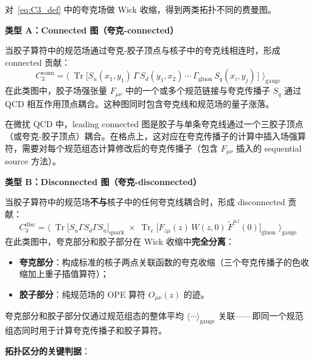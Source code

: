 \documentclass[11pt,a4paper]{ctexart}
\newcommand{\tr}{\operatorname{Tr}}
\begin{document}
对~\eqref{eq:C3_def} 中的夸克场做 Wick 收缩，得到两类拓扑不同的费曼图。

\textbf{类型 A：Connected 图（夸克-connected）}

当胶子算符中的规范场通过夸克-胶子顶点与核子中的夸克线相连时，形成 connected 贡献：
\begin{equation}\label{eq:connected}
C_3^{\text{conn}} = \big\langle\;
\tr\big[ S_u(x_1, y_1) \, \Gamma \, S_d(y_1, x_2) \, \cdots \,
\Gamma_{\text{gluon}} \, S_q(x_i, y_j) \,\big]
\;\big\rangle_{\text{gauge}}
\end{equation}
在此类图中，胶子场强张量 $F_{\mu\nu}$ 中的一个或多个规范链接与夸克传播子 $S_q$ 通过 QCD 相互作用顶点耦合。这种图同时包含夸克线和规范场的量子涨落。

在微扰 QCD 中，leading connected 图是胶子与单条夸克线通过一个三胶子顶点（或夸克-胶子顶点）耦合。在格点上，这对应在夸克传播子的计算中插入场强算符，需要对每个规范组态计算修改后的夸克传播子（包含 $F_{\mu\nu}$ 插入的 sequential source 方法）。

\textbf{类型 B：Disconnected 图（夸克-disconnected）}

当胶子算符中的规范场\textbf{不与}核子中的任何夸克线耦合时，形成 disconnected 贡献：
\begin{equation}\label{eq:disconnected}
C_3^{\text{disc}} = \big\langle\;
\tr\big[ S_u \Gamma S_d \Gamma S_u \big]_{\text{quark}}
\;\times\;
\tr_c\big[ F_{z\mu}(z) \, W(z,0) \, \tilde{F}^{\mu z}(0) \big]_{\text{gluon}}
\;\big\rangle_{\text{gauge}}
\end{equation}
在此类图中，夸克部分和胶子部分在 Wick 收缩中\textbf{完全分离}：
\begin{itemize}
  \item \textbf{夸克部分}：构成标准的核子两点关联函数的夸克收缩（三个夸克传播子的色收缩加上重子插值算符）；
  \item \textbf{胶子部分}：纯规范场的 OPE 算符 $O_{\mu\nu}(z)$ 的迹。
\end{itemize}
夸克部分和胶子部分仅通过规范组态的整体平均 $\langle\cdots\rangle_{\text{gauge}}$ 关联——即同一个规范组态同时用于计算夸克传播子和胶子算符。

\textbf{拓扑区分的关键判据}：
\begin{center}
\end{center}
\end{document}
